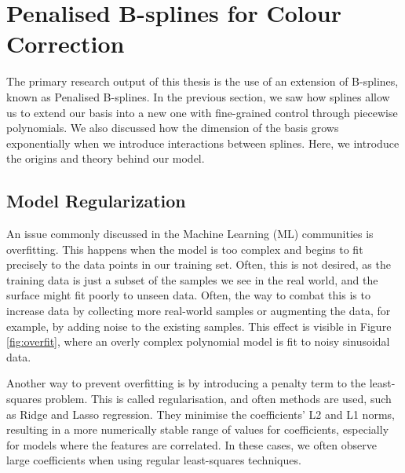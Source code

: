 \section{Penalised B-splines for Colour Correction}

The primary research output of this thesis is the use of an extension of B-splines, known as Penalised B-splines. In the previous section, we saw how splines allow us to extend our basis into a new one with fine-grained control through piecewise polynomials. We also discussed how the dimension of the basis grows exponentially when we introduce interactions between splines. Here, we introduce the origins and theory behind our model.

\subsection{Model Regularization}

An issue commonly discussed in the Machine Learning (ML) communities is overfitting. This happens when the model is too complex and begins to fit precisely to the data points in our training set. Often, this is not desired, as the training data is just a subset of the samples we see in the real world, and the surface might fit poorly to unseen data. Often, the way to combat this is to increase data by collecting more real-world samples or augmenting the data, for example, by adding noise to the existing samples. This effect is visible in Figure \ref{fig:overfit}, where an overly complex polynomial model is fit to noisy sinusoidal data.

Another way to prevent overfitting is by introducing a penalty term to the least-squares problem. 
This is called regularisation, and often methods are used, such as Ridge \cite{hoerl2000ridge} and Lasso \cite{tibshirani1996regression} regression. They minimise the coefficients' L2 and L1 norms, resulting in a more numerically stable range of values for coefficients, especially for models where the features are correlated.\cite[61-69]{HastieTrevor2009EoSL} In these cases, we often observe large coefficients when using regular least-squares techniques.


